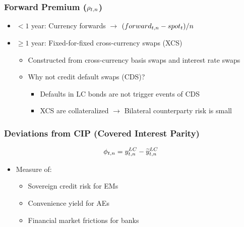 \documentclass[12pt, aspectratio=169, xcolor=dvipsnames]{beamer} 			         %
\begin{document}
\begin{frame}
	\frametitle{Forward Premium ($\rho_{t,n}$)}
	\begin{itemize}
		\item $< 1$ year: Currency forwards $\rightarrow$ $(forward_{t,n} - spot_{t})/n$
		\item $\geq 1$ year: Fixed-for-fixed cross-currency swaps (XCS)
		\iftoggle{long}{\pause}{}
		\begin{itemize}
			\item Constructed from cross-currency basis swaps and interest rate swaps
			\iftoggle{long}{\pause}{}
			\item Why not credit default swaps (CDS)?
			\begin{itemize}
				\item Defaults in LC bonds are not trigger events of CDS
				\item XCS are collateralized $\rightarrow$ Bilateral counterparty risk is small
			\end{itemize}
		\end{itemize}
	\end{itemize}
\end{frame}

\begin{frame}
	\frametitle{Deviations from CIP (Covered Interest Parity)}
	\vspace{-1cm}
	$$\phi_{t,n} = y_{t,n} ^{LC} - \widetilde{y}_{t,n} ^{LC}$$
	\vspace{-1.2cm}
	\begin{itemize}
		\item Measure of:
		\begin{itemize}
			\item Sovereign credit risk for EMs \citep{DuSchreger:2016JoF}
			\item Convenience yield for AEs \citep*{DuImSchreger:2018JIE}
			\item Financial market frictions for banks \citep*{DuTepperVerdelhan:2018}
		\end{itemize}
	\end{itemize}
\end{frame}
\end{document}
